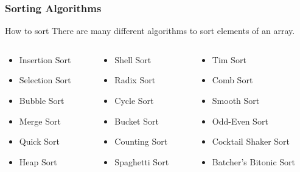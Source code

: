 \documentclass[10pt, compress]{beamer}
\begin{document}
\begin{frame}[fragile]
	\frametitle{Sorting Algorithms}
	\begin{block}{How to sort}
	There are many different algorithms to sort elements of an array.
	\begin{columns}
		\begin{column}{0.3\textwidth}
			\begin{itemize}
				\item[] Insertion Sort
				\item[] Selection Sort
				\item[] Bubble Sort
				\item[] Merge Sort
				\item[] Quick Sort
				\item[] Heap Sort
			\end{itemize}
		\end{column}
		\begin{column}{0.3\textwidth}
			\begin{itemize}
				\item[] Shell Sort
				\item[] Radix Sort
				\item[] Cycle Sort
					\item[] Bucket Sort
 				\item[] Counting Sort
 				\item[] Spaghetti Sort
			\end{itemize}
		\end{column}
		\begin{column}{0.4\textwidth}
			\begin{itemize}
				\item[] Tim Sort
				\item[] Comb Sort
				\item[] Smooth Sort
				\item[] Odd-Even Sort
				\item[] Cocktail Shaker Sort
				\item[] Batcher's Bitonic Sort
			\end{itemize}
		\end{column}
	\end{columns}
	\end{block}
\end{frame}
\end{document}
